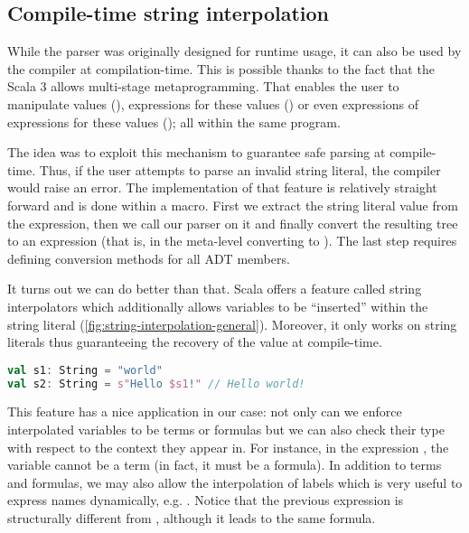 \subsection{Compile-time string interpolation}
\label{sec:parsing-printing-string-interpolation}

While the parser was originally designed for runtime usage, it can also be used by the compiler at compilation-time. This is possible thanks to the fact that the Scala 3 allows multi-stage metaprogramming. That enables the user to manipulate values (), expressions for these values () or even expressions of expressions for these values (); all within the same program.

The idea was to exploit this mechanism to guarantee safe parsing at compile-time. Thus, if the user attempts to parse an invalid string literal, the compiler would raise an error. The implementation of that feature is relatively straight forward and is done within a macro. First we extract the string literal value from the expression, then we call our parser on it and finally convert the resulting tree to an expression (that is, in the meta-level converting  to ). The last step requires defining conversion methods for all ADT members.

It turns out we can do better than that. Scala offers a feature called string interpolators which additionally allows variables to be ``inserted'' within the string literal (\autoref{fig:string-interpolation-general}). Moreover, it only works on string literals thus guaranteeing the recovery of the value at compile-time.

\begin{lstlisting}[language=Scala,caption={[String interpolation general example]{Simple demonstration of the string interpolation mechanism in Scala. The \code{s} interpolator simply calls \code{toString} on each variable passed and concatenates all the parts together.}},label={fig:string-interpolation-general},captionpos=b]
val s1: String = "world"
val s2: String = s"Hello $s1!" // Hello world!
\end{lstlisting}

This feature has a nice application in our case: not only can we enforce interpolated variables to be terms or formulas but we can also check their type with respect to the context they appear in. For instance, in the expression , the variable  cannot be a term (in fact, it must be a formula). In addition to terms and formulas, we may also allow the interpolation of labels which is very useful to express names dynamically, e.g. . Notice that the previous expression is structurally different from , although it leads to the same formula.

